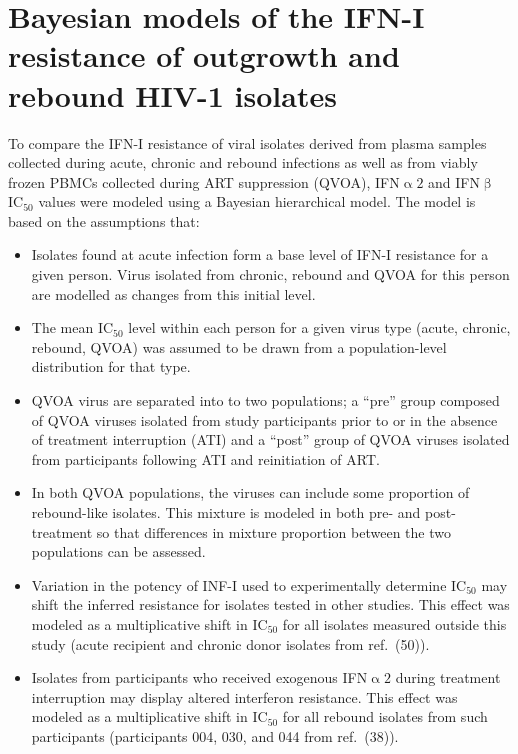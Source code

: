 \documentclass[12pt]{article}
\newcommand{\ifna}{IFN\hspace{-.08em}${\upalpha 2}$}
\newcommand{\ifnb}{IFN\hspace{-.03em}${\upbeta}$}
\newcommand{\icFifty}{IC$_{50}$}
\newcommand{\iyerRef}{(50)}
\newcommand{\azzRef}{(38)}
\begin{document}
\section*{Bayesian models of the IFN-I resistance of outgrowth and rebound HIV-1 isolates}
  To compare the IFN-I resistance of viral isolates derived from plasma samples collected during acute, chronic and rebound infections as well as from viably frozen PBMCs collected during ART suppression (QVOA), \ifna{} and \ifnb{} \icFifty{} values were modeled using a Bayesian hierarchical model. The model is based on the assumptions that:
  \begin{itemize}
    \item Isolates found at  acute infection form a base level of IFN-I resistance for a given person. Virus isolated from chronic, rebound and QVOA for this person are modelled as changes from this initial level.
    \item The mean \icFifty{} level within each person for a given virus type (acute, chronic, rebound, QVOA) was assumed to be drawn from a population-level distribution for that type. 
    \item QVOA virus are separated into to two populations; a ``pre'' group composed of QVOA viruses isolated from study participants prior to or in the absence of treatment interruption (ATI) and a ``post'' group of QVOA viruses isolated from participants following ATI and reinitiation of ART.
    \item In both QVOA populations, the viruses can include some proportion of rebound-like isolates. This mixture is modeled in both pre- and post-treatment so that differences in mixture proportion between the two populations can be assessed.
    \item Variation in the potency of INF-I used to experimentally determine \icFifty{} may shift the inferred resistance for isolates tested in other studies. This effect was modeled as a multiplicative shift in \icFifty{} for all isolates measured outside this study (acute recipient and chronic donor isolates from ref.\ \iyerRef{}).
    \item Isolates from participants who received exogenous \ifna{} during treatment interruption may display altered interferon resistance. This effect was modeled as a multiplicative shift in \icFifty{} for all rebound isolates from such participants (participants 004, 030, and 044 from ref.\ \azzRef{}).
  \end{itemize}
\end{document}
